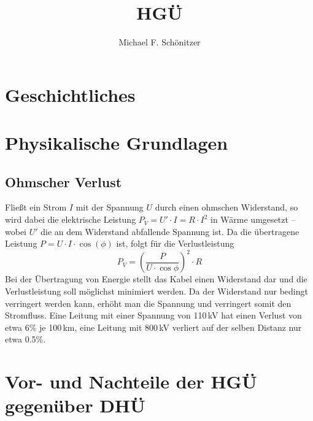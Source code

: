 \documentclass[10pt,a4paper,twoside]{article}
\author{Michael F. Schönitzer}
\title{HGÜ}
\begin{document}
\maketitle

\section{Geschichtliches}

\section{Physikalische Grundlagen}
\subsection{Ohmscher Verlust}
Fließt ein Strom $I$ mit der Spannung $U$ durch einen ohmschen Widerstand, so wird dabei die elektrische Leistung
$P_V = U' \cdot I = R \cdot I^2$
in Wärme umgesetzt – wobei $U'$ die an dem Widerstand abfallende Spannung ist.
Da die übertragene Leistung $P=U \cdot I \cdot \cos(\phi)$ ist, folgt für die Verlustleistung
\[P_V = \left(\frac{P}{U \cdot \cos\phi}\right)^2\cdot R\]
Bei der Übertragung von Energie stellt das Kabel einen Widerstand dar und die Verlustleistung soll möglichst minimiert werden. Da der Widerstand nur bedingt verringert werden kann, erhöht man die Spannung und verringert somit den Stromfluss. Eine Leitung mit einer Spannung von 110\,kV hat einen Verlust von etwa 6\% je 100\,km, eine Leitung mit 800\,kV verliert auf der selben Distanz nur etwa 0.5\%.

\section{Vor- und Nachteile der HGÜ gegenüber DHÜ}
\end{document}
